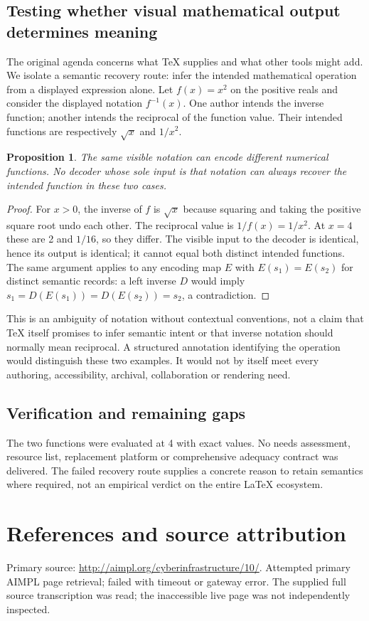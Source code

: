 \documentclass[11pt]{article}
\newtheorem{proposition}{Proposition}
\begin{document}
\subsection{Testing whether visual mathematical output determines meaning}
The original agenda concerns what TeX supplies and what other tools might add. We isolate a semantic recovery route: infer the intended mathematical operation from a displayed expression alone. Let $f(x)=x^2$ on the positive reals and consider the displayed notation $f^{-1}(x)$. One author intends the inverse function; another intends the reciprocal of the function value. Their intended functions are respectively $\sqrt{x}$ and $1/x^2$.
\begin{proposition}
The same visible notation can encode different numerical functions. No decoder whose sole input is that notation can always recover the intended function in these two cases.
\end{proposition}
\begin{proof}
For $x>0$, the inverse of $f$ is $\sqrt{x}$ because squaring and taking the positive square root undo each other. The reciprocal value is $1/f(x)=1/x^2$. At $x=4$ these are 2 and $1/16$, so they differ. The visible input to the decoder is identical, hence its output is identical; it cannot equal both distinct intended functions. The same argument applies to any encoding map $E$ with $E(s_1)=E(s_2)$ for distinct semantic records: a left inverse $D$ would imply $s_1=D(E(s_1))=D(E(s_2))=s_2$, a contradiction.
\end{proof}
This is an ambiguity of notation without contextual conventions, not a claim that TeX itself promises to infer semantic intent or that inverse notation should normally mean reciprocal. A structured annotation identifying the operation would distinguish these two examples. It would not by itself meet every authoring, accessibility, archival, collaboration or rendering need.
\subsection{Verification and remaining gaps}
The two functions were evaluated at 4 with exact values. No needs assessment, resource list, replacement platform or comprehensive adequacy contract was delivered. The failed recovery route supplies a concrete reason to retain semantics where required, not an empirical verdict on the entire LaTeX ecosystem.

\section{References and source attribution}
Primary source: \url{http://aimpl.org/cyberinfrastructure/10/}. Attempted primary AIMPL page retrieval; failed with timeout or gateway error. The supplied full source transcription was read; the inaccessible live page was not independently inspected.
\end{document}

